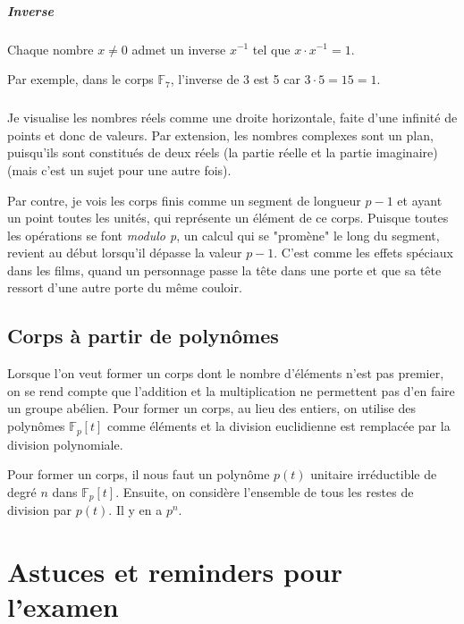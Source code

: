 \documentclass[10pt,a4paper]{book}
\newcommand{\F}{\mathbb{F}}
\begin{document}
\paragraph{Inverse}
Chaque nombre $x\neq 0$ admet un inverse $x^{-1}$ tel que $x\cdot x^{-1}=1$.\par
Par exemple, dans le corps $\F_7$, l'inverse de 3 est 5 car $3\cdot 5=15=1$.

\paragraph{}
Je visualise les nombres réels comme une droite horizontale, faite d'une infinité de points et donc de valeurs. Par extension, les nombres complexes sont un plan, puisqu'ils sont constitués de deux réels (la partie réelle et la partie imaginaire)(mais c'est un sujet pour une autre fois). \par
Par contre, je vois les corps finis comme un segment de longueur $p-1$ et ayant un point toutes les unités, qui représente un élément de ce corps. Puisque toutes les opérations se font \textit{modulo p}, un calcul qui se "promène" le long du segment, revient au début lorsqu'il dépasse la valeur $p-1$. C'est comme les effets spéciaux dans les films, quand un personnage passe la tête dans une porte et que sa tête ressort d'une autre porte du même couloir.

\section{Corps à partir de polynômes}
Lorsque l'on veut former un corps dont le nombre d'éléments n'est pas premier, on se rend compte que l'addition et la multiplication ne permettent pas d'en faire un groupe abélien. Pour former un corps, au lieu des entiers, on utilise des polynômes $\F_p[t]$ comme éléments et la division euclidienne est remplacée par la division polynomiale.\par 
Pour former un corps, il nous faut un polynôme $p(t)$ unitaire irréductible de degré $n$ dans $\F_p[t]$. Ensuite, on considère l'ensemble de tous les restes de division par $p(t)$. Il y en a $p^n$.

\chapter{Astuces et reminders pour l'examen}
\end{document}
